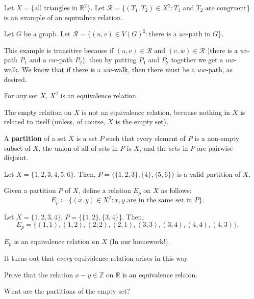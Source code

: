 \begin{eg}
	Let \( X=\{\text{all triangles in } \mathbb{R}^2\}   \). Let \( \mathcal{R} = \{(T_{1},T_{2})\in X^2 \colon T_{1} \text{ and } T_{2} \text{ are congruent}\)\} is an example of an equivalnce relation.
\end{eg}

\begin{eg}
	Let \( G \) be a graph. Let \( \mathcal{R}= \{(u,v) \in V(G)^2 \colon \text{there is a } uv\text{-path in } G  \)\}.
\end{eg}

This example is transitive because if \( (u,v) \in \mathcal{R} \) and \( (v,w) \in \mathcal{R} \) (there is a \( uv \)-path \( P_{1} \) and a \( vw \)-path \( P_{2} \)), then by putting \( P_{1}  \) and \( P_{2} \) together we get a \( uw \)-walk. We know that if there is a \( uw \)-walk, then there must be a \( uw \)-path, as desired.

\begin{eg}
	For any set \( X \), \( X^2 \) is an equivalence relation.
\end{eg}

\begin{note}
	The empty relation on \( X \) is not an equivalence relation, because nothing in \( X \) is related to itself (unless, of course, \( X \) is the empty set).
\end{note}

\begin{definition}
	A \textbf{partition} of a set \( X \) is a set \( P \) such that every element of \( P \) is a non-empty subset of \( X \), the union of all of sets in \( P \) is \( X \), and the sets in \( P \) are pairwise disjoint. 
\end{definition}

\begin{eg}
	Let \( X=\{1,2,3,4,5,6\}   \). Then, \( P = \{\{1,2,3\}, \{4\}, \{5,6\}    \}   \) is a valid partition of \( X \).
\end{eg}

Given a partition \( P \) of \( X \), define a relation \( E_p \) on \( X \) as follows: \[
	E_p \coloneq \{(x,y)\in X^2 \colon x,y \text{ are in the same set in } P\}  
.\] 

\begin{eg}
	Let \( X=\{1,2,3,4\}   \), \( P=\{\{1,2\} ,\{3,4\}   \}   \). Then, \[ E_p=\{(1,1),(1,2),(2,2),(2,1),(3,3),(3,4),(4,4),(4,3)\}   .\]
\end{eg}

\begin{property}
	\( E_p \) is an equivalence relation on \( X \) (In our homework!).
\end{property}

It turns out that \emph{every} equivalence relation arises in this way.

Prove that the relation \( x-y \in \mathbb{Z} \) on \( \mathbb{R} \) is an equivalence relaion.

What are the partitions of the empty set?

